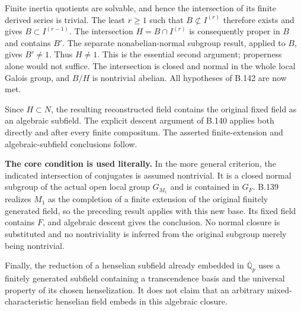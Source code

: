 Finite inertia quotients are solvable, and hence
the intersection of its finite derived series
is trivial.  The least $r\ge1$ such that
$B\not\subset I^{(r)}$ therefore exists and gives
$B\subset I^{(r-1)}$.  The intersection
$H=B\cap I^{(r)}$ is consequently proper in $B$
and contains $B'$.  The separate nonabelian-normal
subgroup result, applied to $B$, gives $B'\ne1$.
Thus $H\ne1$.  This is the essential second
argument; properness alone would not suffice.
The intersection is closed and normal in the
whole local Galois group, and $B/H$ is nontrivial
abelian.  All hypotheses of B.142 are now met.

Since $H\subset N$, the resulting reconstructed
field contains the original fixed field as an
algebraic subfield.  The explicit descent argument
of B.140 applies both directly and after every
finite compositum.  The asserted finite-extension
and algebraic-subfield conclusions follow.

\medskip\noindent\textbf{The core condition is used literally.}
In the more general criterion, the indicated
intersection of conjugates is assumed nontrivial.
It is a closed normal subgroup of the actual
open local group $G_{M_1}$ and is contained in
$G_F$.  B.139 realizes $M_1$ as the completion
of a finite extension of the original finitely
generated field, so the preceding result applies
with this new base.  Its fixed field contains
$F$, and algebraic descent gives the conclusion.
No normal closure is substituted and no
nontriviality is inferred from the original
subgroup merely being nontrivial.

Finally, the reduction of a henselian subfield
already embedded in $\overline{\mathbb Q}_p$
uses a finitely generated subfield containing a
transcendence basis and the universal property
of its chosen henselization.  It does not claim
that an arbitrary mixed-characteristic henselian
field embeds in this algebraic closure.
